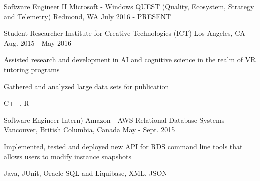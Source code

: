 

\begin{cventries}

  \cventry
    {Software Engineer II} %
    {Microsoft - Windows QUEST (Quality, Ecosystem, Strategy and Telemetry)} %
    {Redmond, WA} %
    {July 2016 - PRESENT} %
    {
    }

  \cventry
    {Student Researcher} %
    {Institute for Creative Technologies (ICT)} %
    {Los Angeles, CA} %
    {Aug. 2015 - May 2016} %
    {
      \begin{cvitems} %
        \item {Assisted research and development in AI and cognitive science in the realm of VR tutoring programs}
        \item {Gathered and analyzed large data sets for publication}
        \item {C++, R}
      \end{cvitems}
    }

  \cventry
    {Software Engineer Intern)} %
    {Amazon - AWS Relational Database Systems} %
    {Vancouver, British Columbia, Canada} %
    {May - Sept. 2015} %
    {
      \begin{cvitems} %
        \item {Implemented, tested and deployed new API for RDS command line tools that allows users to modify instance snapshots}
        \item {Java, JUnit, Oracle SQL and Liquibase, XML, JSON}
      \end{cvitems}
    }


\end{cventries}

